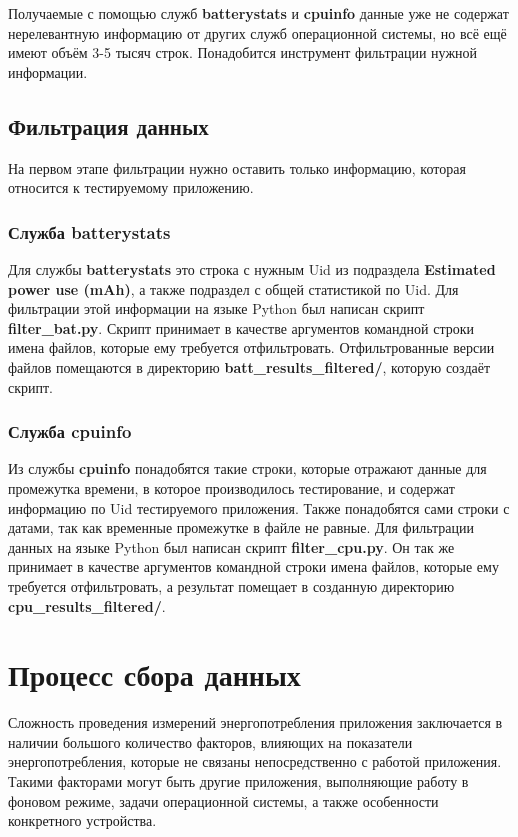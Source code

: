 \documentclass[a4paper,14pt]{extarticle} %
\begin{document}
	Получаемые с помощью служб \textbf{batterystats} и \textbf{cpuinfo} данные уже не содержат нерелевантную информацию от других служб операционной системы, но всё ещё имеют объём 3-5 тысяч строк. Понадобится инструмент фильтрации нужной информации.

	\subsection{Фильтрация данных}
	
	На первом этапе фильтрации нужно оставить только информацию, которая относится к тестируемому приложению. 
	
	\subsubsection{Служба batterystats}
	
	Для службы \textbf{batterystats} это строка с нужным Uid из подраздела \textbf{Estimated power use (mAh)}, а также подраздел с общей статистикой по Uid. Для фильтрации этой информации на языке Python был написан скрипт \textbf{filter\_bat.py}. Скрипт принимает в качестве аргументов командной строки имена файлов, которые ему требуется отфильтровать. Отфильтрованные версии файлов помещаются в директорию \textbf{batt\_results\_filtered/}, которую создаёт скрипт.
	
	\subsubsection{Служба cpuinfo}
	
	Из службы \textbf{cpuinfo} понадобятся такие строки, которые отражают данные для промежутка времени, в которое производилось тестирование, и содержат информацию по Uid тестируемого приложения. Также понадобятся сами строки с датами, так как временные промежутке в файле не равные. Для фильтрации данных на языке Python был написан скрипт \textbf{filter\_cpu.py}. Он так же принимает в качестве аргументов командной строки имена файлов, которые ему требуется отфильтровать, а результат помещает в созданную директорию \textbf{cpu\_results\_filtered/}.

	\newpage
	\section{Процесс сбора данных}
	
	Сложность проведения измерений энергопотребления приложения заключается в наличии большого количество факторов, влияющих на показатели энергопотребления, которые не связаны непосредственно с работой приложения. Такими факторами могут быть другие приложения, выполняющие работу в фоновом режиме, задачи операционной системы, а также особенности конкретного устройства.
	
\end{document}

